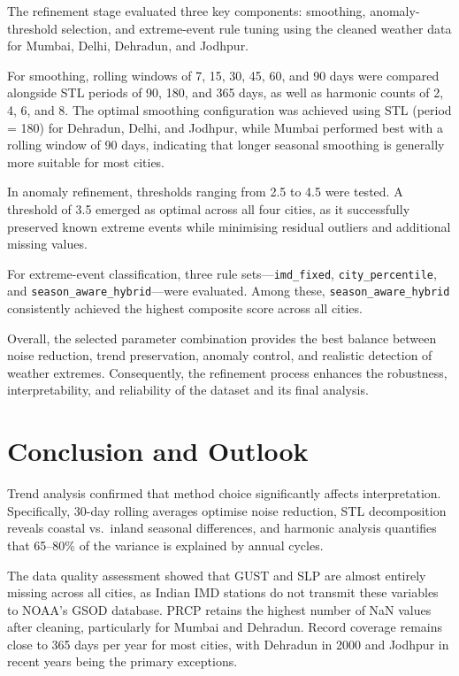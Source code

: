 The refinement stage evaluated three key components: smoothing, anomaly-threshold 
selection, and extreme-event rule tuning using the cleaned weather data for 
Mumbai, Delhi, Dehradun, and Jodhpur. 

For smoothing, rolling windows of 7, 15, 30, 45, 60, and 90 days were compared 
alongside STL periods of 90, 180, and 365 days, as well as harmonic counts of 
2, 4, 6, and 8. The optimal smoothing configuration was achieved using STL 
(period = 180) for Dehradun, Delhi, and Jodhpur, while Mumbai performed best 
with a rolling window of 90 days, indicating that longer seasonal smoothing is 
generally more suitable for most cities.

In anomaly refinement, thresholds ranging from 2.5 to 4.5 were tested. A threshold 
of 3.5 emerged as optimal across all four cities, as it successfully preserved 
known extreme events while minimising residual outliers and additional missing values.

For extreme-event classification, three rule sets---\texttt{imd\_fixed}, 
\texttt{city\_percentile}, and \texttt{season\_aware\_hybrid}---were evaluated. 
Among these, \texttt{season\_aware\_hybrid} consistently achieved the highest 
composite score across all cities.

Overall, the selected parameter combination provides the best balance between 
noise reduction, trend preservation, anomaly control, and realistic detection 
of weather extremes. Consequently, the refinement process enhances the robustness, 
interpretability, and reliability of the dataset and its final analysis.\section{Conclusion and Outlook}

Trend analysis confirmed that method choice significantly affects interpretation. 
Specifically, 30-day rolling averages optimise noise reduction, STL decomposition 
reveals coastal vs.\ inland seasonal differences, and harmonic analysis quantifies 
that 65--80\% of the variance is explained by annual cycles.

The data quality assessment showed that GUST and SLP are almost entirely missing 
across all cities, as Indian IMD stations do not transmit these variables to 
NOAA's GSOD database. PRCP retains the highest number of NaN values after cleaning, 
particularly for Mumbai and Dehradun. Record coverage remains close to 365 days 
per year for most cities, with Dehradun in 2000 and Jodhpur in recent years 
being the primary exceptions.

